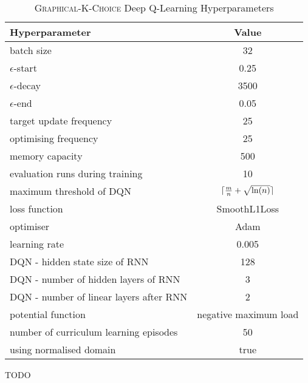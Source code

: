 \begin{table}[h!]\label{tab:graphical-k-choice-hyperparameters}
\begin{threeparttable}
\caption{\textsc{Graphical-K-Choice} Deep Q-Learning Hyperparameters}
\centering
\begin{tabular}{l|c}
\toprule
Hyperparameter             &     Value \\
\midrule
batch size               &     32 \\ 
$\epsilon$-start               &    0.25 \\ 
$\epsilon$-decay         &     3500\\
$\epsilon$-end              &     0.05 \\
target update frequency               &     25 \\ 
optimising frequency          &     25 \\ 
memory capacity     &     500 \\
evaluation runs during training             &     10 \\
maximum threshold of DQN             &     $\lceil\frac{m}{n}+\sqrt{\ln(n)}\rceil$ \\ 
loss function               &     SmoothL1Loss \\ 
optimiser        &     Adam \\
learning rate             &     0.005 \\
DQN - hidden state size of RNN               &     128 \\ 
DQN - number of hidden layers of RNN         &     3 \\ 
DQN - number of linear layers after RNN     &     2 \\
potential function            &    negative maximum load \\
number of curriculum learning episodes            & 50 \\ 
using normalised domain               &     true \\ 
\bottomrule
\end{tabular}
\begin{tablenotes}
      \small
      \item TODO
\end{tablenotes}
\end{threeparttable}
\end{table}